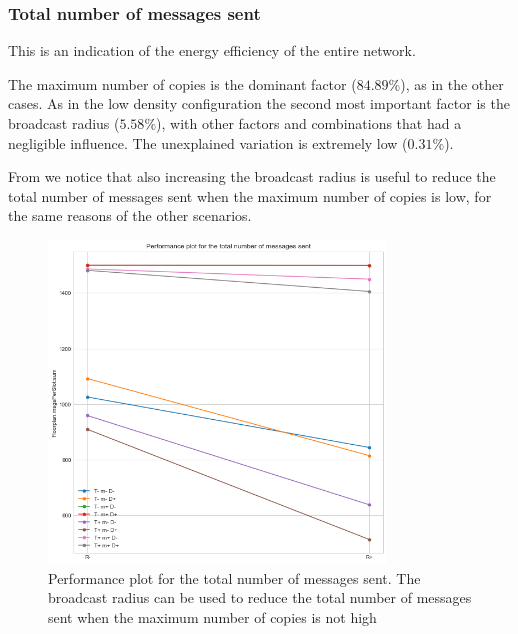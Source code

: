 \subsubsection{Total number of messages sent}\label{subsubsec:rect2krmessages}

This is an indication of the energy efficiency of the entire network.

The maximum number of copies is the dominant factor (\(84.89\%\)), as in the
other cases. As in the low density configuration the second most important
factor is the broadcast radius (\(5.58\%\)), with other factors and combinations
that had a negligible influence. The unexplained variation is extremely low
(\(0.31\%\)).

From  we notice that also increasing the broadcast
radius is useful to reduce the total number of messages sent when the maximum
number of copies is low, for the same reasons of the other scenarios.

\begin{figure}[hbt]
	\centering
	\includegraphics[width=0.8\textwidth]{img/rect/messages_R_perfplot.png}
	\caption{Performance plot for the total number of messages sent. The
	broadcast radius can be used to reduce the total number of messages sent
	when the maximum number of copies is not
	high}\label{fig:rectperfmessagesR}
\end{figure}
